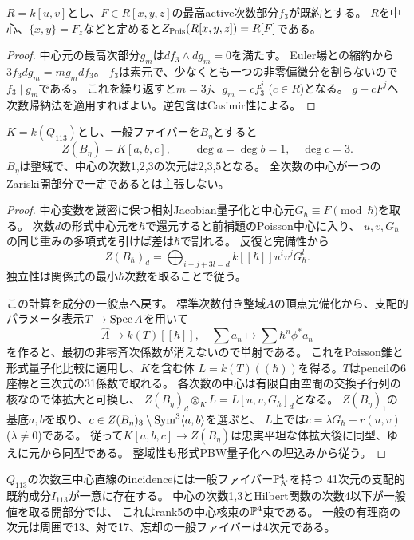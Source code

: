 \begin{lemma}[相対Jacobian括弧の全Poisson中心]
$R=k[u,v]$とし、$F\in R[x,y,z]$の最高active次数部分$f_3$が既約とする。
$R$を中心、$\{x,y\}=F_z$などと定めると$Z_{\rm Pois}(R[x,y,z])=R[F]$である。
\end{lemma}
\begin{proof}
中心元の最高次部分$g_m$は$df_3\wedge dg_m=0$を満たす。
Euler場との縮約から$3f_3dg_m=mg_mdf_3$。
$f_3$は素元で、少なくとも一つの非零偏微分を割らないので$f_3\mid g_m$である。
これを繰り返すと$m=3j$、$g_m=cf_3^j$ ($c\in R$)となる。
$g-cF^j$へ次数帰納法を適用すればよい。逆包含はCasimir性による。
\end{proof}
\begin{theorem}[量子成分の関数体上の中心]
\label{thm:pair-generic-center}
$K=k(Q_{113})$とし、一般ファイバーを$B_\eta$とすると
\[
 Z(B_\eta)=K[a,b,c],\qquad\deg a=\deg b=1,\quad\deg c=3.
\]
$B_\eta$は整域で、中心の次数1,2,3の次元は2,3,5となる。
全次数の中心が一つのZariski開部分で一定であるとは主張しない。
\end{theorem}
\begin{proof}
中心変数を厳密に保つ相対Jacobian量子化と中心元$G_\hbar\equiv F\pmod\hbar$を取る。
次数$d$の形式中心元を$\hbar$で還元すると前補題のPoisson中心に入り、
$u,v,G_\hbar$の同じ重みの多項式を引けば差は$\hbar$で割れる。
反復と完備性から
\[
 Z(B_\hbar)_d=\bigoplus_{i+j+3l=d}k[[\hbar]]u^iv^jG_\hbar^l.
\]
独立性は関係式の最小$\hbar$次数を取ることで従う。

この計算を成分の一般点へ戻す。
標準次数付き整域$A$の頂点完備化から、支配的パラメータ表示$T\to\operatorname{Spec} A$を用いて
\[
 \widehat A\longrightarrow k(T)[[\hbar]],\quad
 \sum a_n\longmapsto\sum\hbar^n\phi^*a_n
\]
を作ると、最初の非零斉次係数が消えないので単射である。
これをPoisson錐と形式量子化比較に適用し、$K$を含む体
$L=k(T)((\hbar))$を得る。$T$はpencilの6座標と三次式の31係数で取れる。
各次数の中心は有限自由空間の交換子行列の核なので体拡大と可換し、
$Z(B_\eta)_d\otimes_K L=L[u,v,G_\hbar]_d$となる。
$Z(B_\eta)_1$の基底$a,b$を取り、$c\in Z(B_\eta)_3\setminus\operatorname{Sym}^3\langle a,b\rangle$を選ぶと、
$L$上では$c=\lambda G_\hbar+r(u,v)$ ($\lambda\ne0$)である。
従って$K[a,b,c]\to Z(B_\eta)$は忠実平坦な体拡大後に同型、ゆえに元から同型である。
整域性も形式PBW量子化への埋込みから従う。
\end{proof}
\begin{corollary}[支配的incidenceと有限次数の良い開部分]
$Q_{113}$の次数三中心直線のincidenceには一般ファイバー$\mathbb P^4_K$を持つ
41次元の支配的既約成分$I_{113}$が一意に存在する。
中心の次数1,3とHilbert関数の次数4以下が一般値を取る開部分では、
これはrank5の中心核束の$\mathbb P^4$束である。
一般の有理商の次元は周囲で13、対で17、忘却の一般ファイバーは4次元である。
\end{corollary}
